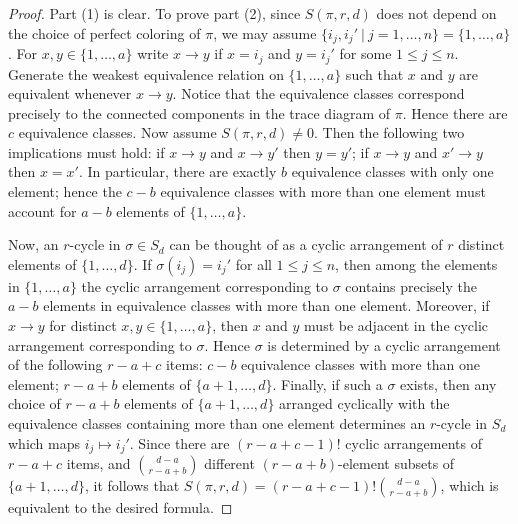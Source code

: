 \documentclass{amsart}
\theoremstyle{definition}
\renewcommand{\1}{_{(1)}}
\renewcommand{\2}{_{(2)}}
\newcommand{\3}{_{(3)}}
\newcommand{\4}{_{(4)}}
\begin{document}
\begin{proof}  Part (1) is clear.  To prove part (2), since $S(\pi, r, d)$ does not depend on the choice of perfect coloring of $\pi$, we may assume $\{i_j, i_j'~|~j=1,\ldots, n\}=\{1,\ldots, a\}$.  For $x, y\in\{1,\ldots, a\}$ write $x\to y$ if $x=i_j$ and $y=i_j'$ for some $1\leq j\leq n$.  Generate the weakest equivalence relation on $\{1,\ldots, a\}$ such that $x$ and $y$ are equivalent whenever $x\to y$.  Notice that the equivalence classes correspond precisely to the connected components in the trace diagram of $\pi$.  Hence there are $c$ equivalence classes.  Now assume $S(\pi, r, d)\not=0$.  Then the following two implications must hold: if $x\to y$ and $x\to y'$ then $y=y'$; if $x\to y$ and $x'\to y$ then $x=x'$.
In particular, there are exactly $b$ equivalence classes with only one element; hence the $c-b$ equivalence classes with more than one element must account for $a-b$ elements of $\{1,\ldots, a\}$.  

Now, an $r$-cycle in $\sigma\in S_d$ can be thought of as a cyclic arrangement of $r$ distinct elements of $\{1,\ldots, d\}$.  If $\sigma(i_j)=i_j'$ for all $1\leq j\leq n$, then among the elements in $\{1,\ldots, a\}$ 
the cyclic arrangement corresponding to $\sigma$ contains precisely the $a-b$ elements in equivalence classes with more than one element.   Moreover, if $x\to y$ for distinct $x, y\in\{1,\ldots, a\}$, then $x$ and $y$ must be adjacent in the cyclic arrangement corresponding to $\sigma$.  Hence $\sigma$ is determined by a cyclic arrangement of the following $r-a+c$ items:  $c-b$ equivalence classes with more than one element;  $r-a+b$ elements of $\{a+1,\ldots, d\}$.  Finally, if such a $\sigma$ exists, then any choice of $r-a+b$ elements of $\{a+1,\ldots, d\}$ arranged cyclically with the equivalence classes containing more than one element determines an $r$-cycle in $S_d$ which maps $i_j\mapsto i_j'$.  Since there are $(r-a+c-1)!$ cyclic arrangements of $r-a+c$ items, and ${d-a\choose r-a+b}$ different $(r-a+b)$-element subsets of $\{a+1,\ldots, d\}$, it follows that $S(\pi, r, d)=(r-a+c-1)!{d-a\choose r-a+b}$, which is equivalent to the desired formula.
\end{proof}
\end{document}
